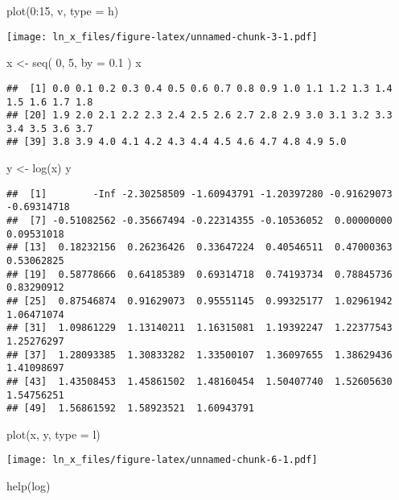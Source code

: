 \documentclass[
]{article}
\newenvironment{Shaded}{\begin{snugshade}}{\end{snugshade}}
\newcommand{\AttributeTok}[1]{\textcolor[rgb]{0.77,0.63,0.00}{#1}}
\newcommand{\DecValTok}[1]{\textcolor[rgb]{0.00,0.00,0.81}{#1}}
\newcommand{\FloatTok}[1]{\textcolor[rgb]{0.00,0.00,0.81}{#1}}
\newcommand{\FunctionTok}[1]{\textcolor[rgb]{0.00,0.00,0.00}{#1}}
\newcommand{\NormalTok}[1]{#1}
\newcommand{\OtherTok}[1]{\textcolor[rgb]{0.56,0.35,0.01}{#1}}
\newcommand{\SpecialCharTok}[1]{\textcolor[rgb]{0.00,0.00,0.00}{#1}}
\newcommand{\StringTok}[1]{\textcolor[rgb]{0.31,0.60,0.02}{#1}}
\begin{document}
\begin{Shaded}
\begin{Highlighting}[]
\FunctionTok{plot}\NormalTok{(}\DecValTok{0}\SpecialCharTok{:}\DecValTok{15}\NormalTok{, v, }\AttributeTok{type =} \StringTok{\textquotesingle{}h\textquotesingle{}}\NormalTok{)}
\end{Highlighting}
\end{Shaded}

\texttt{[image: ln\_x\_files/figure-latex/unnamed-chunk-3-1.pdf]}

\begin{Shaded}
\begin{Highlighting}[]
\NormalTok{x }\OtherTok{\textless{}{-}} \FunctionTok{seq}\NormalTok{( }\DecValTok{0}\NormalTok{, }\DecValTok{5}\NormalTok{, }\AttributeTok{by =} \FloatTok{0.1}\NormalTok{ )}
\NormalTok{x}
\end{Highlighting}
\end{Shaded}

\begin{verbatim}
##  [1] 0.0 0.1 0.2 0.3 0.4 0.5 0.6 0.7 0.8 0.9 1.0 1.1 1.2 1.3 1.4 1.5 1.6 1.7 1.8
## [20] 1.9 2.0 2.1 2.2 2.3 2.4 2.5 2.6 2.7 2.8 2.9 3.0 3.1 3.2 3.3 3.4 3.5 3.6 3.7
## [39] 3.8 3.9 4.0 4.1 4.2 4.3 4.4 4.5 4.6 4.7 4.8 4.9 5.0
\end{verbatim}

\begin{Shaded}
\begin{Highlighting}[]
\NormalTok{y }\OtherTok{\textless{}{-}} \FunctionTok{log}\NormalTok{(x)}
\NormalTok{y}
\end{Highlighting}
\end{Shaded}

\begin{verbatim}
##  [1]        -Inf -2.30258509 -1.60943791 -1.20397280 -0.91629073 -0.69314718
##  [7] -0.51082562 -0.35667494 -0.22314355 -0.10536052  0.00000000  0.09531018
## [13]  0.18232156  0.26236426  0.33647224  0.40546511  0.47000363  0.53062825
## [19]  0.58778666  0.64185389  0.69314718  0.74193734  0.78845736  0.83290912
## [25]  0.87546874  0.91629073  0.95551145  0.99325177  1.02961942  1.06471074
## [31]  1.09861229  1.13140211  1.16315081  1.19392247  1.22377543  1.25276297
## [37]  1.28093385  1.30833282  1.33500107  1.36097655  1.38629436  1.41098697
## [43]  1.43508453  1.45861502  1.48160454  1.50407740  1.52605630  1.54756251
## [49]  1.56861592  1.58923521  1.60943791
\end{verbatim}

\begin{Shaded}
\begin{Highlighting}[]
\FunctionTok{plot}\NormalTok{(x, y, }\AttributeTok{type =} \StringTok{\textquotesingle{}l\textquotesingle{}}\NormalTok{)}
\end{Highlighting}
\end{Shaded}

\texttt{[image: ln\_x\_files/figure-latex/unnamed-chunk-6-1.pdf]}

\begin{Shaded}
\begin{Highlighting}[]
\FunctionTok{help}\NormalTok{(log)}
\end{Highlighting}
\end{Shaded}
\end{document}
